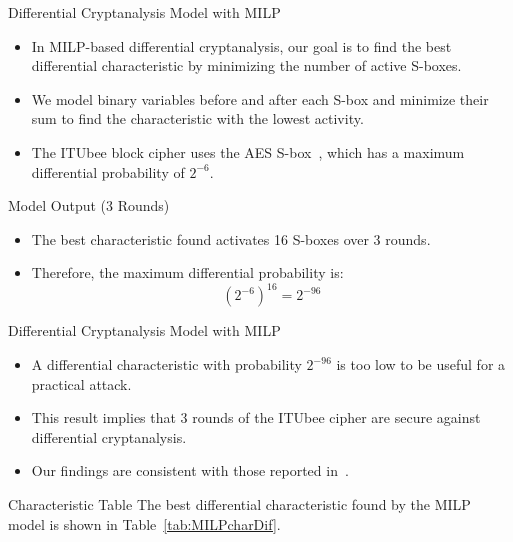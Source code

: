 \documentclass{beamer}
\begin{document}
\begin{frame}{Differential Cryptanalysis Model with MILP}

\begin{itemize}
    \item In MILP-based differential cryptanalysis, our goal is to find the best differential characteristic by minimizing the number of active S-boxes.
    \item We model binary variables before and after each S-box and minimize their sum to find the characteristic with the lowest activity.
    \item The ITUbee block cipher uses the AES S-box~\cite{dworkin2001advanced}, which has a maximum differential probability of $2^{-6}$.
\end{itemize}

\begin{block}{Model Output (3 Rounds)}
\begin{itemize}
    \item The best characteristic found activates 16 S-boxes over 3 rounds.
    \item Therefore, the maximum differential probability is:
    \[
    (2^{-6})^{16} = 2^{-96}
    \]
\end{itemize}
\end{block}

\end{frame}
\begin{frame}{Differential Cryptanalysis Model with MILP}

\begin{itemize}
    \item A differential characteristic with probability $2^{-96}$ is too low to be useful for a practical attack.
    \item This result implies that 3 rounds of the ITUbee cipher are secure against differential cryptanalysis.
    \item Our findings are consistent with those reported in~\cite{karakocc2013itubee}.
\end{itemize}

\begin{block}{Characteristic Table}
The best differential characteristic found by the MILP model is shown in Table~\ref{tab:MILPcharDif}.
\end{block}

\end{frame}
\end{document}
